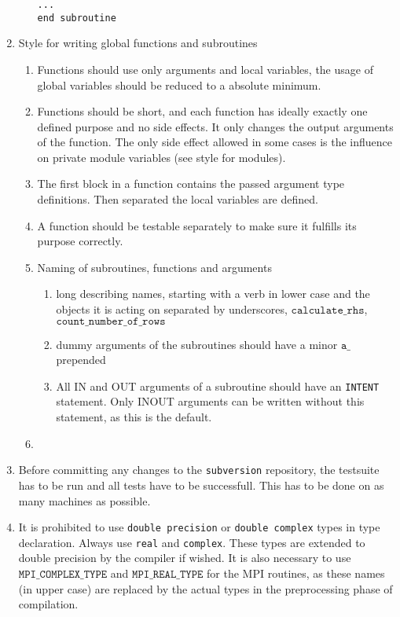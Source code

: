\documentclass[12pt,a4paper]{article}
\begin{document}
\begin{enumerate}
\begin{enumerate}
\begin{minipage}{0.8\linewidth}
\begin{verbatim}
...
end subroutine
\end{verbatim}
        \end{minipage}
  \end{enumerate}

\item Style for writing global functions and subroutines
  \begin{enumerate}
  \item Functions should use only arguments and local variables, the usage of
    global variables should be reduced to a absolute minimum. 
  \item Functions should be short, and each function has ideally exactly one defined
    purpose and no side effects. It only changes the output arguments of the
    function. The only side effect allowed in some cases is the influence on
    private module variables (see style for modules).
  \item The first block in a function contains the passed argument type
    definitions. Then separated the local variables are defined.
  \item A function should be testable separately to make sure it fulfills its
    purpose correctly.
  \item Naming of subroutines, functions and arguments
    \begin{enumerate}
    \item long describing names, starting with a verb in lower case and the
      objects it is acting on separated by underscores, $\mathtt{calculate\_rhs}$,
      $\mathtt{count\_number\_of\_rows}$ 
    \item dummy arguments of the subroutines should have a minor $\mathtt{a\_}$
      prepended
    \item All IN and OUT arguments of a subroutine should have an
      \texttt{INTENT} statement. Only INOUT arguments can be written without
      this statement, as this is the default.
    \end{enumerate}
  \item 
  \end{enumerate}
\item Before committing any changes to the \texttt{subversion} repository, the
  testsuite has to be run and all tests have to be successfull. This has to be
  done on as many machines as possible.
\item It is prohibited to use \texttt{double precision} or \texttt{double
    complex} types in type declaration. Always use \texttt{real} and
  \texttt{complex}. These types are extended to double precision by the
  compiler if wished. It is also necessary to use
  $\mathtt{MPI\_COMPLEX\_TYPE}$ and $\mathtt{MPI\_REAL\_TYPE}$ for the MPI
  routines, as these names (in upper case) are replaced by the actual types in
  the preprocessing phase of compilation.


\end{enumerate}
\end{document}
